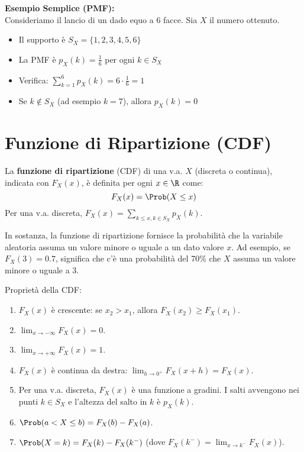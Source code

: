 \noindent\textbf{Esempio Semplice (PMF):} \\
Consideriamo il lancio di un dado equo a 6 facce. Sia $X$ il numero ottenuto.
\begin{itemize}
    \item Il supporto è $S_X = \{1, 2, 3, 4, 5, 6\}$
    \item La PMF è $p_X(k) = \frac{1}{6}$ per ogni $k \in S_X$
    \item Verifica: $\sum_{k=1}^6 p_X(k) = 6 \cdot \frac{1}{6} = 1$
    \item Se $k \notin S_X$ (ad esempio $k=7$), allora $p_X(k) = 0$
\end{itemize}

\section{Funzione di Ripartizione (CDF)}
\begin{definition}
La \textbf{funzione di ripartizione} (CDF) di una v.a. $X$ (discreta o continua), indicata con $F_X(x)$, è definita per ogni $x \in \R$ come:
\[ F_X(x) = \Prob(X \le x) \]
Per una v.a. discreta, $F_X(x) = \sum_{k \le x, k \in S_X} p_X(k)$.

In sostanza, la funzione di ripartizione fornisce la probabilità che la variabile aleatoria assuma un valore minore o uguale a un dato valore $x$. Ad esempio, se $F_X(3) = 0.7$, significa che c'è una probabilità del 70\% che $X$ assuma un valore minore o uguale a 3.

Proprietà della CDF:
\begin{enumerate}
    \item $F_X(x)$ è crescente: se $x_2 > x_1$, allora $F_X(x_2) \ge F_X(x_1)$.
    \item $\lim_{x \to -\infty} F_X(x) = 0$.
    \item $\lim_{x \to +\infty} F_X(x) = 1$.
    \item $F_X(x)$ è continua da destra: $\lim_{h \to 0^+} F_X(x+h) = F_X(x)$.
    \item Per una v.a. discreta, $F_X(x)$ è una funzione a gradini. I salti avvengono nei punti $k \in S_X$ e l'altezza del salto in $k$ è $p_X(k)$.
    \item $\Prob(a < X \le b) = F_X(b) - F_X(a)$.
    \item $\Prob(X=k) = F_X(k) - F_X(k^-)$ (dove $F_X(k^-) = \lim_{x \to k^-} F_X(x)$).
\end{enumerate}
\end{definition}

